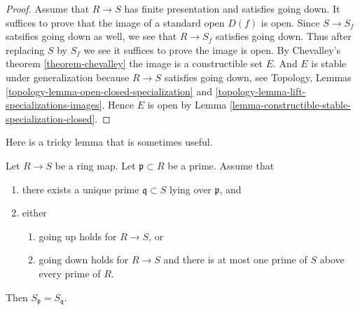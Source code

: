 \begin{proof}
Assume that $R \to S$ has finite presentation and satisfies
going down.
It suffices to prove that the image of a standard open $D(f)$ is open.
Since $S \to S_f$ satsifies going down as well, we see that
$R \to S_f$ satisfies going down. Thus after replacing
$S$ by $S_f$ we see it suffices to prove the image is
open. By Chevalley's theorem \ref{theorem-chevalley}
the image is a constructible set $E$. And $E$ is stable
under generalization because $R \to S$ satisfies going down,
see Topology, Lemmas \ref{topology-lemma-open-closed-specialization}
and \ref{topology-lemma-lift-specializations-images}.
Hence $E$ is open by
Lemma \ref{lemma-constructible-stable-specialization-closed}.
\end{proof}

\noindent
Here is a tricky lemma that is sometimes useful.

\begin{lemma}
\label{lemma-unique-prime-over-localize-below}
Let $R \to S$ be a ring map.
Let $\mathfrak p \subset R$ be a prime.
Assume that
\begin{enumerate}
\item there exists a unique prime $\mathfrak q \subset S$ lying over
$\mathfrak p$, and
\item either
\begin{enumerate}
\item going up holds for $R \to S$, or
\item going down holds for $R \to S$ and there is at most one prime
of $S$ above every prime of $R$.
\end{enumerate}
\end{enumerate}
Then $S_{\mathfrak p} = S_{\mathfrak q}$.
\end{lemma}

